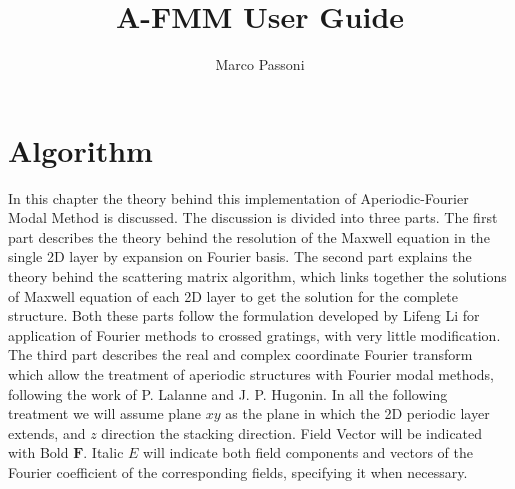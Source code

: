 \documentclass[a4paper,10pt]{report}
\title{A-FMM User Guide}
\author{Marco Passoni}
\date{}
\begin{document}
\maketitle


\chapter{Algorithm} 
In this chapter the theory behind this implementation of Aperiodic-Fourier Modal Method is discussed. The discussion is divided into three parts. The first part describes the theory behind the resolution of the Maxwell equation in the single 2D layer by expansion on Fourier basis. The second part explains the theory behind the scattering matrix algorithm, which links together the solutions of Maxwell equation of each 2D layer to get the solution for the complete structure. Both these parts follow the formulation developed by Lifeng Li for application of Fourier methods to crossed gratings, with very little modification. The third part describes the real and complex coordinate Fourier transform which allow the treatment of aperiodic structures with Fourier modal methods, following the work of P. Lalanne and J. P. Hugonin. In all the following treatment we will assume plane $xy$ as the plane in which the 2D periodic layer extends, and $z$ direction the stacking direction. Field Vector will be indicated with Bold $\mathbf{F}$. Italic $E$ will indicate both field components and vectors of the Fourier coefficient of the corresponding fields, specifying it when necessary. 
\end{document}
